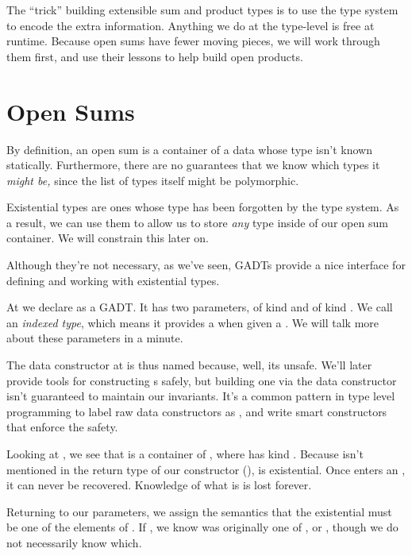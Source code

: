 \documentclass[book.tex]{subfiles}
\begin{document}
The ``trick'' building extensible sum and product types is to use the
type system to encode the extra information. Anything we do at the type-level is
free at runtime. Because open sums have fewer moving pieces, we will work
through them first, and use their lessons to help build open products.


\section{Open Sums}


By definition, an open sum is a container of a data whose type isn't known
statically. Furthermore, there are no guarantees that we know which types it
\emph{might be,} since the list of types itself might be polymorphic.

Existential types are ones whose type has been forgotten by the type system. As a
result, we can use them to allow us to store \emph{any} type inside of our open
sum container. We will constrain this later on.

Although they're not necessary, as we've seen, GADTs provide a nice interface
for defining and working with existential types.


At  we declare  as a GADT. It has two parameters, 
of kind  and  of kind \kind{[k]}. We call  an
\emph{indexed type}, which means it provides a  when given a
. We will talk more about these parameters in a minute.

The data constructor  at  is thus named because, well,
its unsafe. We'll later provide tools for constructing s safely, but
building one via the data constructor isn't guaranteed to maintain our
invariants. It's a common pattern in type level programming to label raw data
constructors as , and write smart constructors that enforce the
safety.

Looking at , we see that  is a container of , where
 has kind . Because  isn't mentioned in the return type of
our constructor (),  is existential. Once  enters an
, it can never be recovered. Knowledge of what  is is lost
forever.

Returning to our parameters, we assign the semantics that the existential 
must be one of the elements of . If ,
we know  was originally one of ,  or , though
we do not necessarily know which.
\end{document}
